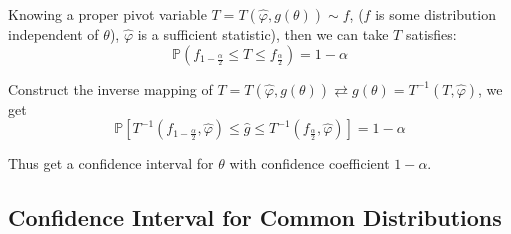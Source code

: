     Knowing a proper pivot variable $T=T(\hat{\varphi},g(\theta))\sim f$, ($f$ is some distribution independent of $\theta$), $\hat{\varphi}$ is a sufficient statistic), then we can take $T$ satisfies:
    \begin{equation}
        \mathbb{P}(f_{1-\frac{\alpha}{2}}\leq T\leq f_{\frac{\alpha}{2}})=1-\alpha
    \end{equation}

    Construct the inverse mapping of $T=T(\hat{\varphi},g(\theta))\rightleftarrows g(\theta)=T^{-1}(T,\hat{\varphi})$, we get
    \begin{equation}
        \mathbb{P}[T^{-1}(f_{1-\frac{\alpha}{2}},\hat{\varphi})\leq\hat{g}\leq T^{-1}(f_{\frac{\alpha}{2}},\hat{\varphi})]=1-\alpha
    \end{equation}
    
    Thus get a confidence interval for $\theta$ with confidence coefficient $1-\alpha$.\\


\subsection{Confidence Interval for Common Distributions}\label{SubSectionConfidenceIntervalForDistributions}

